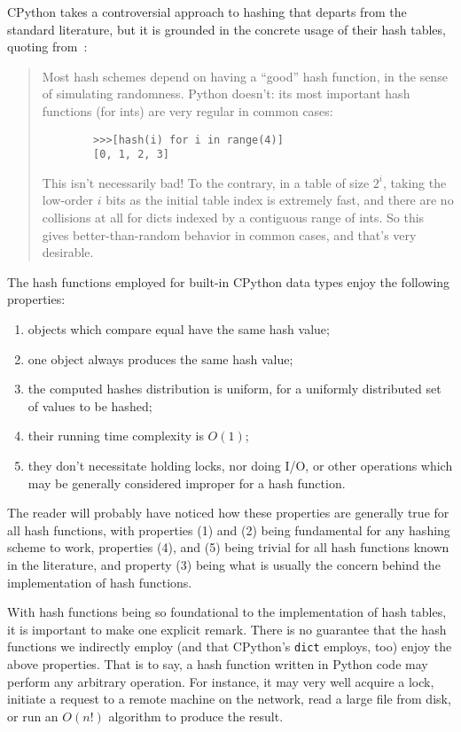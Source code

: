 CPython takes a controversial approach to hashing that departs from the standard literature, but it is grounded in the concrete usage of their hash tables, quoting from~\cite{dict-comment-hash}:
\begin{quote}
	Most hash schemes depend on having a ``good'' hash function, in the sense of simulating randomness.
	Python doesn't:  its most important hash functions (for ints) are very regular in common cases:
	\begin{verbatim}
		>>>[hash(i) for i in range(4)]
	  	[0, 1, 2, 3]
	\end{verbatim}
	This isn't necessarily bad!
	To the contrary, in a table of size $2^i$, taking the low-order $i$ bits as the initial table index is extremely fast, and there are no collisions at all for dicts indexed by a contiguous range of ints.
	So this gives better-than-random behavior in common cases, and that's very desirable.
\end{quote}

The hash functions employed for built-in CPython data types enjoy the following properties:
\begin{enumerate}
	\item objects which compare equal have the same hash value;
	\item one object always produces the same hash value;
	\item the computed hashes distribution is uniform, for a uniformly distributed set of values to be hashed;
	\item their running time complexity is $O(1)$;
	\item they don't necessitate holding locks, nor doing I/O, or other operations which may be generally considered improper for a hash function.
\end{enumerate}
The reader will probably have noticed how these properties are generally true for all hash functions, with properties (1) and (2) being fundamental for any hashing scheme to work, properties (4), and (5) being trivial for all hash functions known in the literature, and property (3) being what is usually the concern behind the implementation of hash functions.

With hash functions being so foundational to the implementation of hash tables, it is important to make one explicit remark.
There is no guarantee that the hash functions we indirectly employ (and that CPython's \texttt{dict} employs, too) enjoy the above properties.
That is to say, a hash function written in Python code may perform any arbitrary operation.
For instance, it may very well acquire a lock, initiate a request to a remote machine on the network, read a large file from disk, or run an $O(n!)$ algorithm to produce the result.

